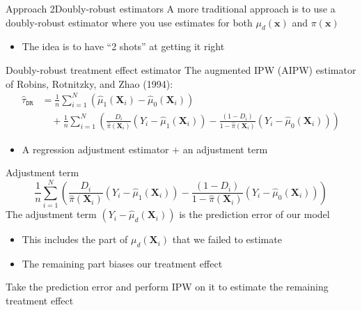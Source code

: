 \documentclass[aspectratio=169,t,11pt,table]{beamer}
\begin{document}
\begin{frame}{Approach 2}{Doubly-robust estimators}
  A more traditional approach is to use a \alert{doubly-robust estimator} where you use estimates for both $\mu_d(\bm{x})$ and $\pi(\bm{x})$
  \begin{itemize}
    \item The idea is to have ``2 shots'' at getting it right
  \end{itemize}
\end{frame}

\begin{frame}{Doubly-robust treatment effect estimator}
  The augmented IPW (AIPW) estimator of Robins, Rotnitzky, and Zhao (1994):
  \begin{align*}
    \hat{\tau}_{\texttt{DR}} &= \frac{1}{n} \sum_{i=1}^N \left( \hat{\mu}_{1}(\bm{X}_i) - \hat{\mu}_{0}(\bm{X}_i) \right) \\
    &\quad+ \frac{1}{n} \sum_{i=1}^N \left( 
       \frac{D_i}{\hat{\pi}(\bm{X}_i)} (Y_i - \hat{\mu}_{1}(\bm{X}_i)) -
       \frac{(1 - D_i)}{1 - \hat{\pi}(\bm{X}_i)} (Y_i - \hat{\mu}_{0}(\bm{X}_i)) 
    \right) 
  \end{align*}
  \begin{itemize}
    \item A regression adjustment estimator $+$ an adjustment term
  \end{itemize}
\end{frame}

\begin{frame}{Adjustment term}
  \vspace*{-\bigskipamount}
  $$
    \frac{1}{n} \sum_{i=1}^N \left( 
      \frac{D_i}{\hat{\pi}(\bm{X}_i)} (Y_i - \hat{\mu}_{1}(\bm{X}_i)) -
      \frac{(1 - D_i)}{1 - \hat{\pi}(\bm{X}_i)} (Y_i - \hat{\mu}_{0}(\bm{X}_i)) 
    \right) 
  $$
  The adjustment term $(Y_i - \hat{\mu}_d(\bm{X}_i))$ is the prediction error of our model
  \begin{itemize}
    \item This includes the part of $\mu_d(\bm{X}_i)$ that we failed to estimate
    \item The remaining part biases our treatment effect
  \end{itemize}
  
  Take the prediction error and perform IPW on it to estimate the remaining treatment effect
\end{frame}
\end{document}
